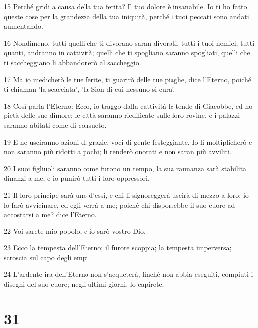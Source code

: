 \par 15 Perché gridi a causa della tua ferita? Il tuo dolore è insanabile. Io ti ho fatto queste cose per la grandezza della tua iniquità, perché i tuoi peccati sono andati aumentando.
\par 16 Nondimeno, tutti quelli che ti divorano saran divorati, tutti i tuoi nemici, tutti quanti, andranno in cattività; quelli che ti spogliano saranno spogliati, quelli che ti saccheggiano li abbandonerò al saccheggio.
\par 17 Ma io medicherò le tue ferite, ti guarirò delle tue piaghe, dice l'Eterno, poiché ti chiaman 'la scacciata', 'la Sion di cui nessuno si cura'.
\par 18 Così parla l'Eterno: Ecco, io traggo dalla cattività le tende di Giacobbe, ed ho pietà delle sue dimore; le città saranno riedificate sulle loro rovine, e i palazzi saranno abitati come di consueto.
\par 19 E ne usciranno azioni di grazie, voci di gente festeggiante. Io li moltiplicherò e non saranno più ridotti a pochi; li renderò onorati e non saran più avviliti.
\par 20 I suoi figliuoli saranno come furono un tempo, la sua raunanza sarà stabilita dinanzi a me, e io punirò tutti i loro oppressori.
\par 21 Il loro principe sarà uno d'essi, e chi li signoreggerà uscirà di mezzo a loro; io lo farò avvicinare, ed egli verrà a me; poiché chi disporrebbe il suo cuore ad accostarsi a me? dice l'Eterno.
\par 22 Voi sarete mio popolo, e io sarò vostro Dio.
\par 23 Ecco la tempesta dell'Eterno; il furore scoppia; la tempesta imperversa; scroscia sul capo degli empi.
\par 24 L'ardente ira dell'Eterno non s'acqueterà, finché non abbia eseguiti, compiuti i disegni del suo cuore; negli ultimi giorni, lo capirete.

\chapter{31}

